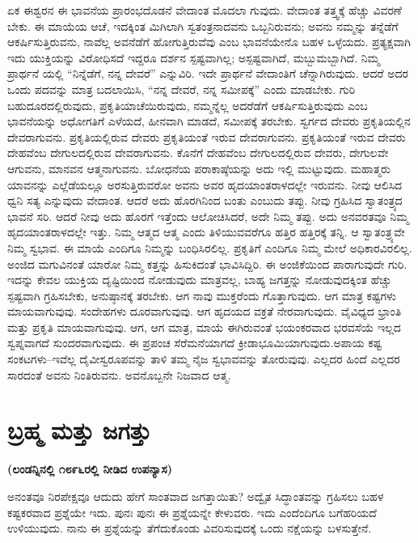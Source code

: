 ಏಕ ಈಶ್ವರನ ಈ ಭಾವನೆಯ ಪ್ರಾರಂಭದೊಡನೆ ವೇದಾಂತ ಮೊದಲಾ ಗುವುದು. ವೇದಾಂತ ತತ್ತ್ವಕ್ಕೆ ಹೆಚ್ಚು ವಿವರಣೆ ಬೇಕು. ಈ ಮಾಯೆಯ ಆಚೆ, ಇದಕ್ಕಿಂತ ಮಿಗಿಲಾಗಿ ಸ್ವತಂತ್ರನಾದವನು ಒಬ್ಬನಿರುವನು; ಅವನು ನಮ್ಮನ್ನು ತನ್ನೆಡೆಗೆ ಆಕರ್ಷಿಸುತ್ತಿರುವನು, ನಾವೆಲ್ಲ ಅವನೆಡೆಗೆ ಹೋಗುತ್ತಿರುವೆವು ಎಂಬ ಭಾವನೆಯೇನೊ ಬಹಳ ಒಳ್ಳೆಯದು. ಪ್ರತ್ಯಕ್ಷವಾಗಿ ಇದು ಯುಕ್ತಿಯನ್ನು ವಿರೋಧಿಸದೆ ಇದ್ದರೂ ದರ್ಶನ ಸ್ಪಷ್ಟವಾಗಿಲ್ಲ; ಅಸ್ಪಷ್ಟವಾಗಿದೆ, ಮಬ್ಬುಮಬ್ಬಾಗಿದೆ. ನಿಮ್ಮ ಪ್ರಾರ್ಥನೆ ಯಲ್ಲಿ “ನಿನ್ನೆಡೆಗೆ, ನನ್ನ ದೇವರೆ” ಎನ್ನುವಿರಿ. ಇದೇ ಪ್ರಾರ್ಥನೆ ವೇದಾಂತಿಗೆ ಚೆನ್ನಾಗಿರುವುದು. ಆದರೆ ಅದರ ಒಂದು ಪದವನ್ನು ಮಾತ್ರ ಬದಲಾಯಿಸಿ, “ನನ್ನ ದೇವರೆ, ನನ್ನ ಸಮೀಪಕ್ಕೆ” ಎಂದು ಮಾಡಬೇಕು. ಗುರಿ ಬಹುದೂರದಲ್ಲಿರುವುದು, ಪ್ರಕೃತಿಯಾಚೆಯಿರುವುದು, ನಮ್ಮನ್ನೆಲ್ಲ ಅದರೆಡೆಗೆ ಆಕರ್ಷಿಸುತ್ತಿರುವುದು ಎಂಬ ಭಾವನೆಯನ್ನು ಅಧೋಗತಿಗೆ ಎಳೆಯದೆ, ಹೀನವಾಗಿ ಮಾಡದೆ, ಸಮೀಪಕ್ಕೆ ತರಬೇಕು. ಸ್ವರ್ಗದ ದೇವರು ಪ್ರಕೃತಿಯಲ್ಲಿನ ದೇವರಾಗುವನು. ಪ್ರಕೃತಿಯಲ್ಲಿರುವ ದೇವರು ಪ್ರಕೃತಿಯಂತೆ ಇರುವ ದೇವರಾಗುವನು. ಪ್ರಕೃತಿಯಂತೆ ಇರುವ ದೇವರು ದೇಹವೆಂಬ ದೇಗುಲದಲ್ಲಿರುವ ದೇವರಾಗುವನು. ಕೊನೆಗೆ ದೇಹವೆಂಬ ದೇಗುಲದಲ್ಲಿರುವ ದೇವರು, ದೇಗುಲವೇ ಆಗುವನು, ಮಾನವನ ಆತ್ಮನಾಗುವನು. ಬೋಧನೆಯ ಪರಾಕಾಷ್ಠೆಯನ್ನು ಅದು ಇಲ್ಲಿ ಮುಟ್ಟುವುದು. ಮಹಾತ್ಮರು ಯಾವನನ್ನು ಎಲ್ಲೆಡೆಯಲ್ಲೂ ಅರಸುತ್ತಿರುವರೋ ಅವನು ಅವರ ಹೃದಯಾಂತರಾಳದಲ್ಲೇ ಇರುವನು. ನೀವು ಆಲಿಸಿದ ಧ್ವನಿ ಸತ್ಯ ಎನ್ನುವುದು ವೇದಾಂತ. ಆದರೆ ಅದು ಹೊರಗಿನಿಂದ ಬಂತು ಎಂಬುದು ತಪ್ಪು. ನೀವು ಗ್ರಹಿಸಿದ ಸ್ವಾತಂತ್ರ್ಯದ ಭಾವನೆ ಸರಿ. ಆದರೆ ನೀವು ಅದು ಹೊರಗೆ ಇತ್ತೆಂದು ಆಲೋಚಿಸಿದರೆ, ಅದೇ ನಿಮ್ಮ ತಪ್ಪು. ಅದು ಅನವರತವೂ ನಿಮ್ಮ ಹೃದಯಾಂತರಾಳದಲ್ಲೇ ಇತ್ತು. ನಿಮ್ಮ ಆತ್ಮದ ಆತ್ಮ ಎಂದು ತಿಳಿಯುವವರೆಗೂ ಹತ್ತಿರ ಹತ್ತಿರಕ್ಕೆ ತನ್ನಿ. ಆ ಸ್ವಾತಂತ್ರ್ಯವೇ ನಿಮ್ಮ ಸ್ವಭಾವ. ಈ ಮಾಯೆ ಎಂದಿಗೂ ನಿಮ್ಮನ್ನು ಬಂಧಿಸಿರಲಿಲ್ಲ. ಪ್ರಕೃತಿಗೆ ಎಂದಿಗೂ ನಿಮ್ಮ ಮೇಲೆ ಅಧಿಕಾರವಿರಲಿಲ್ಲ. ಅಂಜಿದ ಮಗುವಿನಂತೆ ಯಾರೋ ನಿಮ್ಮ ಕತ್ತನ್ನು ಹಿಸುಕಿದಂತೆ ಭಾವಿಸಿದ್ದಿರಿ. ಈ ಅಂಜಿಕೆಯಿಂದ ಪಾರಾಗುವುದೇ ಗುರಿ. ಇದನ್ನು ಕೇವಲ ಯುಕ್ತಿಯ ದೃಷ್ಟಿಯಿಂದ ನೋಡುವುದು ಮಾತ್ರವಲ್ಲ, ಬಾಹ್ಯ ಜಗತ್ತನ್ನು ನೋಡುವುದಕ್ಕಿಂತ ಹೆಚ್ಚು ಸ್ಪಷ್ಟವಾಗಿ ಗ್ರಹಿಸಬೇಕು, ಅನುಷ್ಠಾನಕ್ಕೆ ತರಬೇಕು. ಆಗ ನಾವು ಮುಕ್ತರೆಂದು ಗೊತ್ತಾಗುವುದು. ಆಗ ಮಾತ್ರ ಕಷ್ಟಗಳು ಮಾಯವಾಗುವುವು. ಸಂದೇಹಗಳು ದೂರವಾಗುವುವು. ಆಗ ಹೃದಯದ ವಕ್ರತೆ ನೇರವಾಗುವುದು. ವೈವಿಧ್ಯದ ಭ್ರಾಂತಿ ಮತ್ತು ಪ್ರಕೃತಿ ಮಾಯವಾಗುವುವು. ಆಗ, ಆಗ ಮಾತ್ರ, ಮಾಯೆ ಈಗಿರುವಂತೆ ಭಯಂಕರವಾದ ಭರವಸೆಯೆ ಇಲ್ಲದ ಸ್ವಪ್ನವಾಗದೆ ಸುಂದರವಾಗುವುದು. ಈ ಪ್ರಪಂಚ ಸೆರೆಮನೆಯಾಗದೆ ಕ್ರೀಡಾಭೂಮಿಯಾಗುವುದು.ಅಪಾಯ ಕಷ್ಟ ಸಂಕಟಗಳು–ಇವೆಲ್ಲ ದೈವೀಸ್ವರೂಪವನ್ನು ತಾಳಿ ತಮ್ಮ ನೈಜ ಸ್ವಭಾವವನ್ನು ತೋರುವುವು. ಎಲ್ಲದರ ಹಿಂದೆ ಎಲ್ಲದರ ಸಾರದಂತೆ ಅವನು ನಿಂತಿರುವನು. ಅವನೊಬ್ಬನೇ ನಿಜವಾದ ಆತ್ಮ.

\chapter{ಬ್ರಹ್ಮ ಮತ್ತು ಜಗತ್ತು}

\centerline{\textbf{(ಲಂಡನ್ನಿನಲ್ಲಿ ೧೮೯೬ರಲ್ಲಿ ನೀಡಿದ ಉಪನ್ಯಾಸ)}}

ಅನಂತವೂ ನಿರಪೇಕ್ಷವೂ ಆದುದು ಹೇಗೆ ಸಾಂತವಾದ ಜಗತ್ತಾಯಿತು? ಅದ್ವೈತ ಸಿದ್ಧಾಂತವನ್ನು ಗ್ರಹಿಸಲು ಬಹಳ ಕಷ್ಟಕರವಾದ ಪ್ರಶ್ನೆಯೇ ಇದು. ಪುನಃ ಪುನಃ ಈ ಪ್ರಶ್ನೆಯನ್ನೇ ಕೇಳುವರು. ಇದು ಎಂದೆಂದಿಗೂ ಬಗೆಹರಿಯದೆ ಉಳಿಯುವುದು. ನಾನು ಈ ಪ್ರಶ್ನೆಯನ್ನು ತೆಗೆದುಕೊಂಡು ವಿವರಿಸುವುದಕ್ಕೆ ಒಂದು ನಕ್ಷೆಯನ್ನು ಬಳಸುತ್ತೇನೆ.

